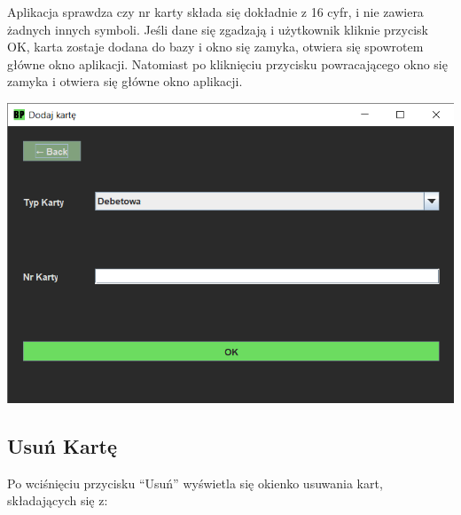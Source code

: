 \documentclass[12pt, letterpaper]{article}
\begin{document}
\quad Aplikacja sprawdza czy nr karty składa się dokładnie z 16 cyfr, i nie zawiera żadnych innych symboli. 
Jeśli dane się zgadzają i użytkownik kliknie przycisk OK, karta zostaje dodana do bazy i okno się zamyka, otwiera się spowrotem główne okno aplikacji.
Natomiast po kliknięciu przycisku powracającego okno się zamyka i otwiera się główne okno aplikacji.

\begin{center}
	\includegraphics[scale=0.6]{dodaj}
\end{center}

\newpage

\subsection{Usuń Kartę}

\quad Po wciśnięciu przycisku “Usuń” wyświetla się okienko usuwania kart, składających się z:
\end{document}
